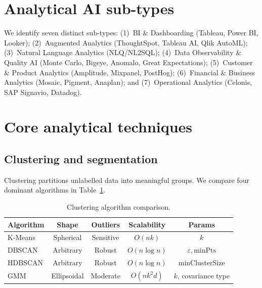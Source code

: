 \documentclass[preprint,12pt,authoryear]{elsarticle}
\theoremstyle{definition}
\begin{document}
\section{Analytical AI sub-types}\label{sec:subtypes}

We identify seven distinct sub-types: (1)~BI \& Dashboarding (Tableau, Power BI, Looker); (2)~Augmented Analytics (ThoughtSpot, Tableau AI, Qlik AutoML); (3)~Natural Language Analytics (NLQ/NL2SQL); (4)~Data Observability \& Quality AI (Monte Carlo, Bigeye, Anomalo, Great Expectations); (5)~Customer \& Product Analytics (Amplitude, Mixpanel, PostHog); (6)~Financial \& Business Analytics (Mosaic, Pigment, Anaplan); and (7)~Operational Analytics (Celonis, SAP Signavio, Datadog).

\section{Core analytical techniques}\label{sec:techniques}

\subsection{Clustering and segmentation}

Clustering partitions unlabelled data into meaningful groups. We compare four dominant algorithms in Table~\ref{tab:clustering}.

\begin{table}[ht]
\centering
\caption{Clustering algorithm comparison.}
\label{tab:clustering}
\begin{tabular}{lcccc}
\toprule
\textbf{Algorithm} & \textbf{Shape} & \textbf{Outliers} & \textbf{Scalability} & \textbf{Params} \\
\midrule
K-Means   & Spherical  & Sensitive   & $O(nk)$      & $k$ \\
DBSCAN    & Arbitrary  & Robust      & $O(n \log n)$ & $\varepsilon, \text{minPts}$ \\
HDBSCAN   & Arbitrary  & Robust      & $O(n \log n)$ & minClusterSize \\
GMM       & Ellipsoidal & Moderate   & $O(nk^2d)$   & $k$, covariance type \\
\bottomrule
\end{tabular}
\end{table}
\end{document}
